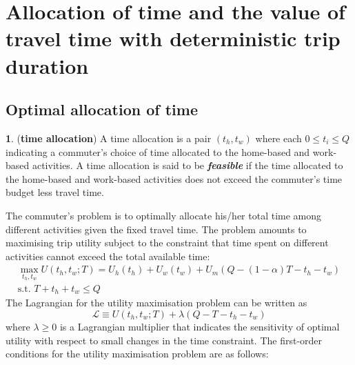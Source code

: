 \documentclass[12pt,a4paper,british]{article}
\theoremstyle{definition}
\newtheorem{defn}{\protect\definitionname}
\theoremstyle{plain}
\theoremstyle{plain}
\providecommand{\definitionname}{Definition}
\begin{document}
\section{Allocation of time and the value of travel time with deterministic
trip duration}

\subsection{Optimal allocation of time}
\begin{defn}
(\textbf{time allocation}) A time allocation is a pair $\left(t_{h},t_{w}\right)$
where each $0\leq t_{i}\leq Q$ indicating a commuter's choice of
time allocated to the home-based and work-based activities. A time
allocation is said to be \textbf{\textit{feasible}} if the time allocated
to the home-based and work-based activities does not exceed the commuter's
time budget less travel time.
\end{defn}
The commuter's problem is to optimally allocate his/her total time
among different activities given the fixed travel time. The problem
amounts to maximising trip utility subject to the constraint that
time spent on different activities cannot exceed the total available
time:
\begin{gather*}
\max_{t_{h},t_{w}}U\left(t_{h},t_{w};T\right)=U_{h}\left(t_{h}\right)+U_{w}\left(t_{w}\right)+U_{m}\left(Q-\left(1-\alpha\right)T-t_{h}-t_{w}\right)\\
\mbox{s.t. }T+t_{h}+t_{w}\leq Q
\end{gather*}
 The Lagrangian for the utility maximisation problem can be written
as
\[
\mathcal{L}\equiv U\left(t_{h},t_{w};T\right)+\lambda\left(Q-T-t_{h}-t_{w}\right)
\]
where $\lambda\geq0$ is a Lagrangian multiplier that indicates the
sensitivity of optimal utility with respect to small changes in the
time constraint. The first-order conditions for the utility maximisation
problem are as follows:
\end{document}
